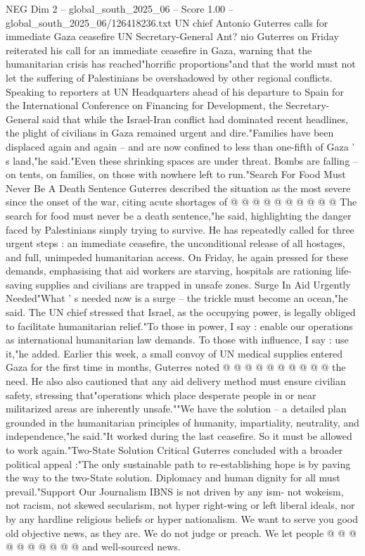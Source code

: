 \begin{textsample}{NEG Dim 2 – global\_south\_2025\_06 – Score 1.00 – global\_south\_2025\_06/126418236.txt}  \label{ex:f2_neg_197}
UN chief Antonio Guterres calls for immediate Gaza ceasefire UN Secretary-General Ant? nio Guterres on Friday reiterated his call for an immediate ceasefire in Gaza, warning that the humanitarian crisis has reached"horrific proportions"and that the world must not let the suffering of Palestinians be overshadowed by other regional conflicts.
Speaking to reporters at UN Headquarters ahead of his departure to Spain for the International Conference on Financing for Development, the Secretary-General said that while the Israel-Iran conflict had dominated recent headlines, the plight of civilians in Gaza remained urgent and dire."Families have been displaced again and again -- and are now confined to less than one-fifth of Gaza ' s land,"he said."Even these shrinking spaces are under threat.
Bombs are falling -- on tents, on families, on those with nowhere left to run."Search For Food Must Never Be A Death Sentence Guterres described the situation as the most severe since the onset of the war, citing acute shortages of @ @ @ @ @ @ @ @ @ @ The search for food must never be a death sentence,"he said, highlighting the danger faced by Palestinians simply trying to survive.
He has repeatedly called for three urgent steps : an immediate ceasefire, the unconditional release of all hostages, and full, unimpeded humanitarian access.
On Friday, he again pressed for these demands, emphasising that aid workers are starving, hospitals are rationing life-saving supplies and civilians are trapped in unsafe zones.
Surge In Aid Urgently Needed"What ' s needed now is a surge -- the trickle must become an ocean,"he said.
The UN chief stressed that Israel, as the occupying power, is legally obliged to facilitate humanitarian relief."To those in power, I say : enable our operations as international humanitarian law demands.
To those with influence, I say : use it,"he added.
Earlier this week, a small convoy of UN medical supplies entered Gaza for the first time in months, Guterres noted @ @ @ @ @ @ @ @ @ @ the need.
He also also cautioned that any aid delivery method must ensure civilian safety, stressing that"operations which place desperate people in or near militarized areas are inherently unsafe.""We have the solution -- a detailed plan grounded in the humanitarian principles of humanity, impartiality, neutrality, and independence,"he said."It worked during the last ceasefire.
So it must be allowed to work again."Two-State Solution Critical Guterres concluded with a broader political appeal :"The only sustainable path to re-establishing hope is by paving the way to the two-State solution.
Diplomacy and human dignity for all must prevail."Support Our Journalism IBNS is not driven by any ism- not wokeism, not racism, not skewed secularism, not hyper right-wing or left liberal ideals, nor by any hardline religious beliefs or hyper nationalism.
We want to serve you good old objective news, as they are.
We do not judge or preach.
We let people @ @ @ @ @ @ @ @ @ @ and well-sourced news.

\end{textsample}
